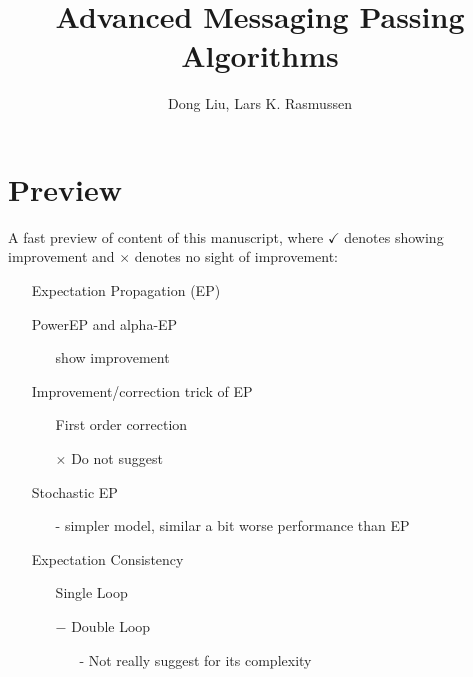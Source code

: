 \documentclass{article}
\title{Advanced Messaging Passing Algorithms}
\author{Dong Liu, Lars K. Rasmussen}
\begin{document}
\maketitle
\tableofcontents


\section{Preview}
A fast preview of content of this manuscript, where $\checkmark$ denotes showing improvement and $\times$ denotes no sight of improvement:
\begin{itemize}
\item[\checkmark] Expectation Propagation (EP)
\item[\checkmark] PowerEP and alpha-EP
  \begin{itemize}
  \item[\checkmark] show improvement
  \end{itemize}
\item[\checkmark] Improvement/correction trick of EP
  \begin{itemize}
  \item[\checkmark] First order correction
  \item[$\times$] Do not suggest
  \end{itemize}
\item[\checkmark] Stochastic EP
  \begin{itemize}
  \item[-] simpler model, similar a bit worse performance than EP
  \end{itemize}
\item[\checkmark] Expectation Consistency
  \begin{itemize}
  \item[\checkmark] Single Loop

  \item[$-$] Double Loop
    \begin{itemize}
    \item[-] Not really suggest for its complexity
    \end{itemize}
    
  \end{itemize}
  
  
\end{itemize}
\end{document}
